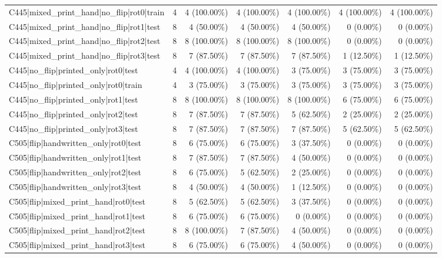 \begin{longtable}{>{\raggedright\arraybackslash}p{5cm}rrrrrr}
C445|mixed\_print\_hand|no\_flip|rot0|train & 4 & 4 (100.00\%) & 4 (100.00\%) & 4 (100.00\%) & 4 (100.00\%) & 4 (100.00\%) \\
C445|mixed\_print\_hand|no\_flip|rot1|test & 8 & 4 (50.00\%) & 4 (50.00\%) & 4 (50.00\%) & 0 (0.00\%) & 0 (0.00\%) \\
C445|mixed\_print\_hand|no\_flip|rot2|test & 8 & 8 (100.00\%) & 8 (100.00\%) & 8 (100.00\%) & 0 (0.00\%) & 0 (0.00\%) \\
C445|mixed\_print\_hand|no\_flip|rot3|test & 8 & 7 (87.50\%) & 7 (87.50\%) & 7 (87.50\%) & 1 (12.50\%) & 1 (12.50\%) \\
C445|no\_flip|printed\_only|rot0|test & 4 & 4 (100.00\%) & 4 (100.00\%) & 3 (75.00\%) & 3 (75.00\%) & 3 (75.00\%) \\
C445|no\_flip|printed\_only|rot0|train & 4 & 3 (75.00\%) & 3 (75.00\%) & 3 (75.00\%) & 3 (75.00\%) & 3 (75.00\%) \\
C445|no\_flip|printed\_only|rot1|test & 8 & 8 (100.00\%) & 8 (100.00\%) & 8 (100.00\%) & 6 (75.00\%) & 6 (75.00\%) \\
C445|no\_flip|printed\_only|rot2|test & 8 & 7 (87.50\%) & 7 (87.50\%) & 5 (62.50\%) & 2 (25.00\%) & 2 (25.00\%) \\
C445|no\_flip|printed\_only|rot3|test & 8 & 7 (87.50\%) & 7 (87.50\%) & 7 (87.50\%) & 5 (62.50\%) & 5 (62.50\%) \\
C505|flip|handwritten\_only|rot0|test & 8 & 6 (75.00\%) & 6 (75.00\%) & 3 (37.50\%) & 0 (0.00\%) & 0 (0.00\%) \\
C505|flip|handwritten\_only|rot1|test & 8 & 7 (87.50\%) & 7 (87.50\%) & 4 (50.00\%) & 0 (0.00\%) & 0 (0.00\%) \\
C505|flip|handwritten\_only|rot2|test & 8 & 6 (75.00\%) & 5 (62.50\%) & 2 (25.00\%) & 0 (0.00\%) & 0 (0.00\%) \\
C505|flip|handwritten\_only|rot3|test & 8 & 4 (50.00\%) & 4 (50.00\%) & 1 (12.50\%) & 0 (0.00\%) & 0 (0.00\%) \\
C505|flip|mixed\_print\_hand|rot0|test & 8 & 5 (62.50\%) & 5 (62.50\%) & 3 (37.50\%) & 0 (0.00\%) & 0 (0.00\%) \\
C505|flip|mixed\_print\_hand|rot1|test & 8 & 6 (75.00\%) & 6 (75.00\%) & 0 (0.00\%) & 0 (0.00\%) & 0 (0.00\%) \\
C505|flip|mixed\_print\_hand|rot2|test & 8 & 8 (100.00\%) & 7 (87.50\%) & 4 (50.00\%) & 0 (0.00\%) & 0 (0.00\%) \\
C505|flip|mixed\_print\_hand|rot3|test & 8 & 6 (75.00\%) & 6 (75.00\%) & 4 (50.00\%) & 0 (0.00\%) & 0 (0.00\%) \\

\end{longtable}

